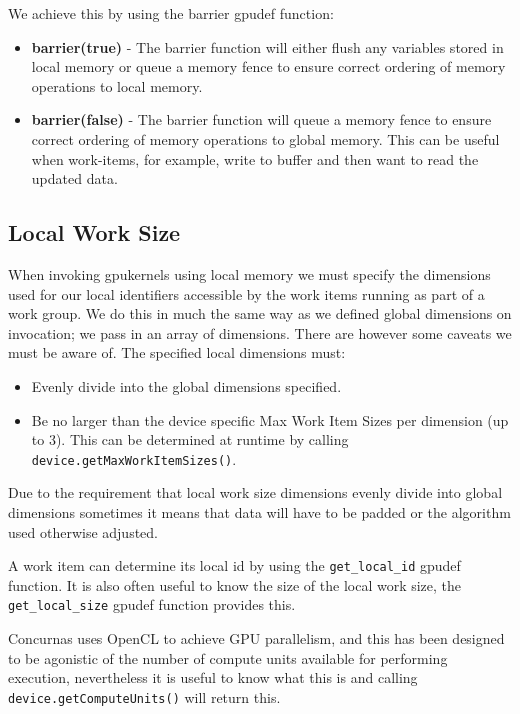 \documentclass[conc-doc]{subfiles}
\begin{document}
We achieve this by using the barrier gpudef function:
\begin{itemize}
	\item \textbf{barrier(true)} - The barrier function will either flush any variables stored in local memory or queue a memory fence to ensure correct ordering of memory operations to local memory.
	\item \textbf{barrier(false)} - The barrier function will queue a memory fence to ensure correct ordering of memory operations to global memory. This can be useful when work-items, for example, write to buffer and then want to read the updated data.
\end{itemize}



\subsection{Local Work Size}
When invoking gpukernels using local memory we must specify the dimensions used for our local identifiers accessible by the work items running as part of a work group. We do this in much the same way as we defined global dimensions on invocation; we pass in an array of dimensions. There are however some caveats we must be aware of. The specified local dimensions must:
\begin{itemize}
	\item Evenly divide into the global dimensions specified.
	\item Be no larger than the device specific Max Work Item Sizes per dimension (up to 3). This can be determined at runtime by calling \lstinline{device.getMaxWorkItemSizes()}.
\end{itemize}

Due to the requirement that local work size dimensions evenly divide into global dimensions sometimes it means that data will have to be padded or the algorithm used otherwise adjusted.  

A work item can determine its local id by using the \lstinline{get_local_id} gpudef function. It is also often useful to know the size of the local work size, the \lstinline{get_local_size} gpudef function provides this.

Concurnas uses OpenCL to achieve GPU parallelism, and this has been designed to be agonistic of the number of compute units available for performing execution, nevertheless it is useful to know what this is and calling \lstinline{device.getComputeUnits()} will return this.
\end{document}
